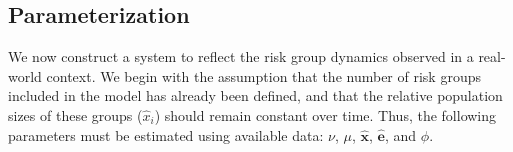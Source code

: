 \subsection{Parameterization}\label{ss:params}
We now construct a system 
to reflect the risk group dynamics observed in a real-world context.  %
We begin with the assumption 
that the number of risk groups included in the model has already been defined,
and that the relative population sizes of these groups ($\hat{x}_i$) should remain constant over time. %
Thus, the following parameters must be estimated using available data:
$\nu$, $\mu$, $\bm{\hat{x}}$, $\bm{\hat{e}}$, and $\phi$.
